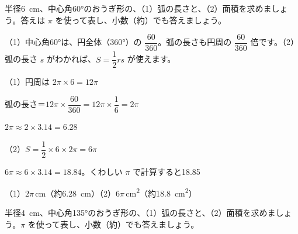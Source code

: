 {}


\begin{reidai}[度で、弧の長さとおうぎ形の面積を求める]
半径\qty{6}{cm}、中心角60°のおうぎ形の、（1）\nobreak 弧の長さと、（2）\nobreak 面積を求めましょう。答えは $\pi$ を使って表し、小数（約）でも答えましょう。\par
\kangaekata （1）中心角60°は、円全体（360°）の $\dfrac{60}{360}$。弧の長さも円周の $\dfrac{60}{360}$ 倍です。（2）弧の長さ $s$ がわかれば、$S=\dfrac{1}{2}rs$ が使えます。\par
\shiki （1）円周は $2\pi\times6=12\pi$\par
\hspace*{4.3\zw}弧の長さ＝$12\pi\times\dfrac{60}{360}=12\pi\times\dfrac{1}{6}=2\pi$\par
\hspace*{4.3\zw}$2\pi\approx2\times3.14=6.28$\par
\hspace*{2.6\zw}（2）$S=\dfrac{1}{2}\times6\times2\pi=6\pi$\par
\hspace*{4.3\zw}$6\pi\approx6\times3.14=18.84$。くわしい $\pi$ で計算すると18.85\par
\kotae （1）\nobreak $2\pi$\,cm（約\qty{6.28}{cm}）\quad（2）\nobreak $6\pi$\,\unit{cm^2}（約\qty{18.8}{cm^2}）
\end{reidai}

\begin{jibun}
半径\qty{4}{cm}、中心角135°のおうぎ形の、（1）\nobreak 弧の長さと、（2）\nobreak 面積を求めましょう。$\pi$ を使って表し、小数（約）でも答えましょう。
\end{jibun}

